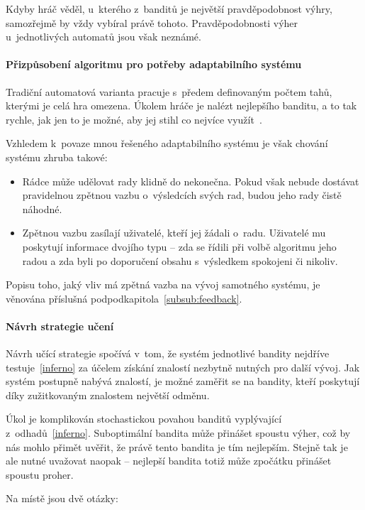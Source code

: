 \documentclass[thesis=M,czech]{FITthesis}[2014/05/07]
\begin{document}
Kdyby hráč věděl, u~kterého z~banditů je největší pravděpodobnost výhry, samozřejmě by vždy vybíral právě tohoto. Pravděpodobnosti výher u~jednotlivých automatů jsou však neznámé.

\paragraph{Přizpůsobení algoritmu pro potřeby adaptabilního systému}
Tradiční automatová varianta pracuje s~předem definovaným počtem tahů, kterými je celá hra omezena. Úkolem hráče je nalézt nejlepšího banditu, a to tak rychle, jak jen to je možné, aby jej stihl co nejvíce využít~\cite{camdp}.

Vzhledem k~povaze mnou řešeného adaptabilního systému je však chování systému zhruba takové:

\begin{itemize}
	\item Rádce může udělovat rady klidně do nekonečna. Pokud však nebude dostávat pravidelnou zpětnou vazbu o~výsledcích svých rad, budou jeho rady čistě náhodné.
	\item Zpětnou vazbu zasílají uživatelé, kteří jej žádali o~radu. Uživatelé mu poskytují informace dvojího typu – zda se řídili při volbě algoritmu jeho radou a zda byli po doporučení obsahu s~výsledkem spokojeni či nikoliv.  
\end{itemize}

Popisu toho, jaký vliv má zpětná vazba na vývoj samotného systému, je věnována příslušná podpodkapitola~\ref{subsub:feedback}.

\paragraph{Návrh strategie učení}
	
Návrh učící strategie spočívá v~tom, že systém jednotlivé bandity nejdříve testuje~\ref{inferno} za účelem získání znalostí nezbytně nutných pro další vývoj. Jak systém postupně nabývá znalostí, je možné zaměřit se na bandity, kteří poskytují díky zužitkovaným znalostem největší odměnu. 

Úkol je komplikován stochastickou povahou banditů vyplývající z~odhadů~\ref{inferno}. Suboptimální bandita může přinášet spoustu výher, což by nás mohlo přimět uvěřit, že právě tento bandita je tím nejlepším. Stejně tak je ale nutné uvažovat naopak – nejlepší bandita totiž může zpočátku přinášet spoustu proher.

Na místě jsou dvě otázky:
\end{document}
